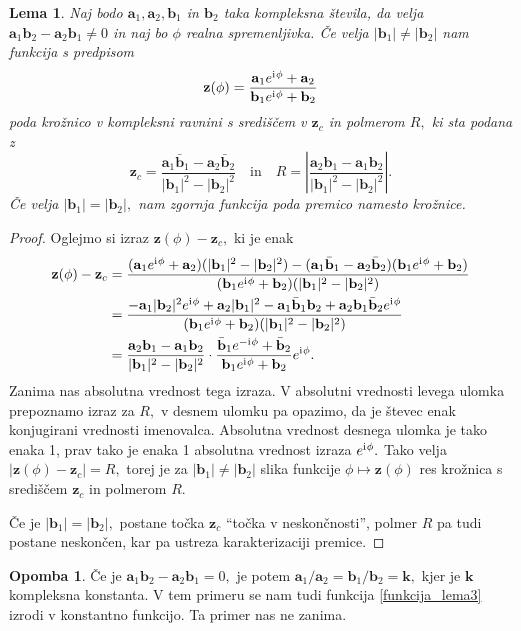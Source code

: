 \documentclass[12pt,a4paper,twoside]{article}
\newcommand{\iu}{\mathrm{i}\mkern1mu} %
\theoremstyle{definition} %
\newtheorem{opomba}[definicija]{Opomba}
\theoremstyle{plain} %
\newtheorem{lema}[definicija]{Lema}
\theoremstyle{primerstyle}
\numberwithin{equation}{section}  %
\newcommand{\aV}{\mathbf{a}}
\newcommand{\bV}{\mathbf{b}}
\newcommand{\kV}{\mathbf{k}}
\newcommand{\zV}{\mathbf{z}}
\begin{document}
\begin{lema}
	\label{lema_3}
	Naj bodo $\aV_1,\aV_2,\bV_1$ in $\bV_2$ taka kompleksna števila, da velja $\aV_1\bV_2-\aV_2\bV_1\neq 0$ in naj bo $\phi$ realna spremenljivka. Če velja $|\bV_1|\neq|\bV_2|$ nam funkcija s predpisom
	\begin{equation}
		\label{funkcija_lema3}
		\zV(\phi)=\frac{\aV_1e^{\iu\phi}+\aV_2}{\bV_1e^{\iu\phi}+\bV_2}
	\end{equation}
	poda krožnico v kompleksni ravnini s središčem v $\zV_c$ in polmerom $R,$ ki sta podana z
	\begin{equation}
		\zV_c=\frac{\aV_1\bar{\bV}_1-\aV_2\bar{\bV}_2}{|\bV_1|^2-|\bV_2|^2}\quad\text{in}\quad R=\left|\frac{\aV_2\bV_1-\aV_1\bV_2}{|\bV_1|^2-|\bV_2|^2}\right|.
	\end{equation}
	Če velja $|\bV_1|=|\bV_2|,$ nam zgornja funkcija poda premico namesto krožnice.
\end{lema}
\begin{proof}
	Oglejmo si izraz $\zV(\phi)-\zV_c,$ ki je enak
	\begin{align*}
		\zV(\phi)-\zV_c&=\frac{(\aV_1e^{\iu\phi}+\aV_2)(|\bV_1|^2-|\bV_2|^2)-(\aV_1\bar{\bV}_1-\aV_2\bar{\bV}_2)(\bV_1e^{\iu\phi}+\bV_2)}{(\bV_1e^{\iu\phi}+\bV_2)(|\bV_1|^2-|\bV_2|^2)}\\
		&=\frac{-\aV_1|\bV_2|^2e^{\iu\phi}+\aV_2|\bV_1|^2-\aV_1\bar{\bV}_1\bV_2+\aV_2\bV_1\bar{\bV}_2e^{\iu\phi}}{(\bV_1e^{\iu\phi}+\bV_2)(|\bV_1|^2-|\bV_2|^2)}\\
		&=\frac{\aV_2\bV_1-\aV_1\bV_2}{|\bV_1|^2-|\bV_2|^2}\cdot\frac{\bar{\bV}_1e^{-\iu\phi}+\bar{\bV}_2}{\bV_1e^{\iu\phi}+\bV_2}e^{\iu\phi}.
	\end{align*}
	Zanima nas absolutna vrednost tega izraza. V absolutni vrednosti levega ulomka prepoznamo izraz za $R,$ v desnem ulomku pa opazimo, da je števec enak konjugirani vrednosti imenovalca. Absolutna vrednost desnega ulomka je tako enaka 1, prav tako je enaka 1 absolutna vrednost izraza $e^{\iu\phi}.$ Tako velja $|\zV(\phi)-\zV_c|=R,$ torej je za $|\bV_1|\neq|\bV_2|$ slika funkcije $\phi\mapsto\zV(\phi)$ res krožnica s središčem $\zV_c$ in polmerom $R.$
	
	Če je $|\bV_1|=|\bV_2|,$ postane točka $\zV_c$ ``točka v neskončnosti'', polmer $R$ pa tudi postane neskončen, kar pa ustreza karakterizaciji premice.
\end{proof}

\begin{opomba}
	Če je $\aV_1\bV_2-\aV_2\bV_1=0,$ je potem $\aV_1/\aV_2=\bV_1/\bV_2=\kV,$ kjer je $\kV$ kompleksna konstanta. V tem primeru se nam tudi funkcija \eqref{funkcija_lema3} izrodi v konstantno funkcijo. Ta primer nas ne zanima.
\end{opomba}
\end{document}
